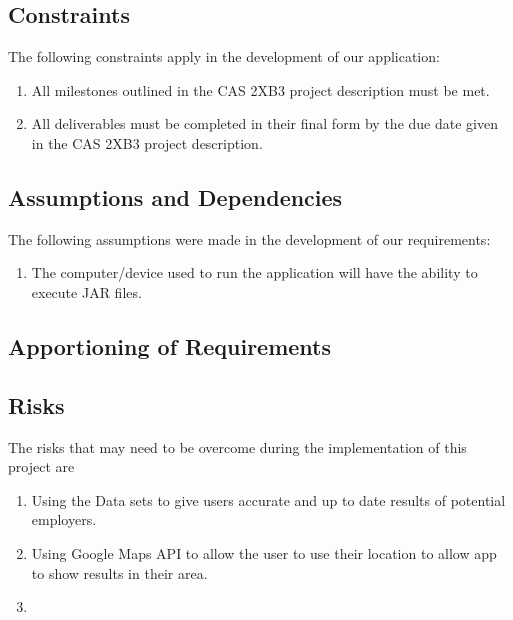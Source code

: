 \documentclass[english]{article}
\begin{document}
\subsection{Constraints}
\label{sub:constraints}

\label{sub:constraints}
The following constraints apply in the development of our application:
\begin{enumerate}
	\item All milestones outlined in the CAS 2XB3 project description must be met.
	\item All deliverables must be completed in their final form by the due date given in the CAS 2XB3 project description.
\end{enumerate}

\subsection{Assumptions and Dependencies}
\label{sub:assumptions_and_dependencies}
The following assumptions were made in the development of our requirements:
\begin{enumerate}
	\item The computer/device used to run the application will have the ability to execute JAR files. 
\end{enumerate}

\subsection{Apportioning of Requirements}
\label{sub:apportioning_of_requirements}


\subsection{Risks}

The risks that may need to be overcome during the implementation of this project are 

\medskip
\begin{enumerate}

\item Using the Data sets to give users accurate and up to date results of potential employers. 

\item Using Google Maps API to allow the user to use their location to allow app to show results in their area.  

\color{red} \item 

\end{enumerate}
\end{document}

